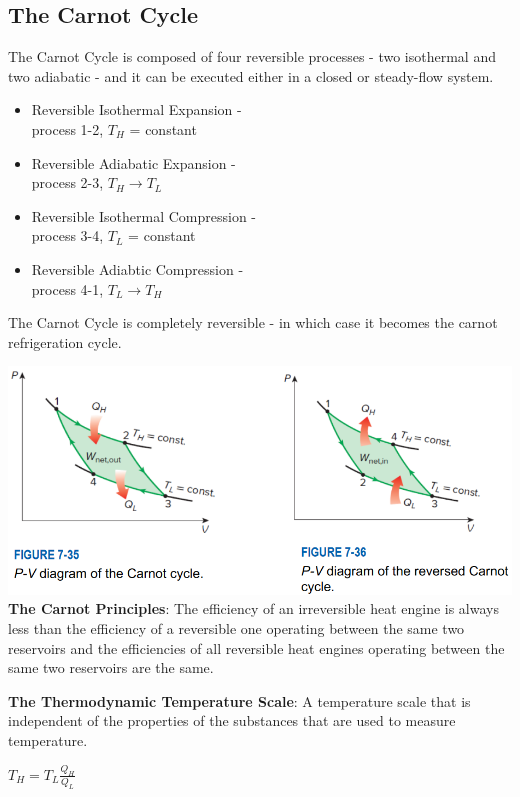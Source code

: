 \documentclass{article}
\begin{document}
\begin{multicols}{3}
    \subsection*{The Carnot Cycle}
    The Carnot Cycle is composed of four reversible processes - two isothermal and two adiabatic - and it can be executed either in a closed or steady-flow system.
    \begin{itemize}
        \item Reversible Isothermal Expansion - \\process 1-2, $T_H$ = constant
        \item Reversible Adiabatic Expansion - \\process 2-3, $T_H\rightarrow T_L$
        \item Reversible Isothermal Compression - \\process 3-4, $T_L$ = constant
        \item Reversible Adiabtic Compression - \\process 4-1, $T_L\rightarrow T_H$
    \end{itemize}
    The Carnot Cycle is completely reversible - in which case it becomes the carnot refrigeration cycle.\par
    \includegraphics[width=\linewidth]{Images/Pv_Carnot.png}
    \textbf{The Carnot Principles}: The efficiency of an irreversible heat engine is always less than the efficiency of a reversible one operating between the same two reservoirs and the efficiencies of all reversible heat engines operating between the same two reservoirs are the same.\par
    \textbf{The Thermodynamic Temperature Scale}: A temperature scale that is independent of the properties of the substances that are used to measure temperature.\par 
    $T_H=T_L\frac{Q_H}{Q_L}$\par 

\end{multicols}
\end{document}
